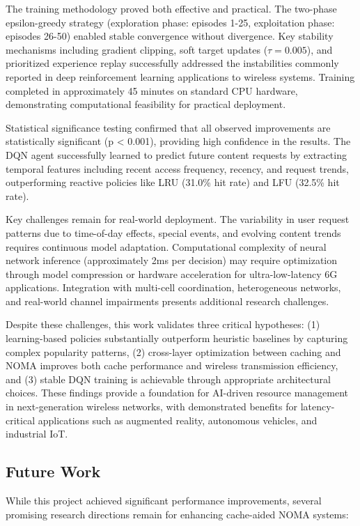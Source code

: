 \documentclass[12pt,a4paper]{article}
\begin{document}
The training methodology proved both effective and practical. The two-phase epsilon-greedy strategy (exploration phase: episodes 1-25, exploitation phase: episodes 26-50) enabled stable convergence without divergence. Key stability mechanisms including gradient clipping, soft target updates ($\tau = 0.005$), and prioritized experience replay successfully addressed the instabilities commonly reported in deep reinforcement learning applications to wireless systems. Training completed in approximately 45 minutes on standard CPU hardware, demonstrating computational feasibility for practical deployment.

Statistical significance testing confirmed that all observed improvements are statistically significant (p < 0.001), providing high confidence in the results. The DQN agent successfully learned to predict future content requests by extracting temporal features including recent access frequency, recency, and request trends, outperforming reactive policies like LRU (31.0\% hit rate) and LFU (32.5\% hit rate).

Key challenges remain for real-world deployment. The variability in user request patterns due to time-of-day effects, special events, and evolving content trends requires continuous model adaptation. Computational complexity of neural network inference (approximately 2ms per decision) may require optimization through model compression or hardware acceleration for ultra-low-latency 6G applications. Integration with multi-cell coordination, heterogeneous networks, and real-world channel impairments presents additional research challenges.

Despite these challenges, this work validates three critical hypotheses: (1) learning-based policies substantially outperform heuristic baselines by capturing complex popularity patterns, (2) cross-layer optimization between caching and NOMA improves both cache performance and wireless transmission efficiency, and (3) stable DQN training is achievable through appropriate architectural choices. These findings provide a foundation for AI-driven resource management in next-generation wireless networks, with demonstrated benefits for latency-critical applications such as augmented reality, autonomous vehicles, and industrial IoT.

\subsection{Future Work}

While this project achieved significant performance improvements, several promising research directions remain for enhancing cache-aided NOMA systems:
\end{document}
